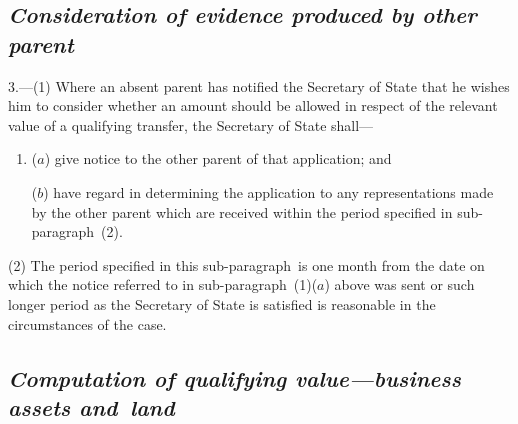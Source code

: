 \documentclass[12pt,a4paper]{article}
\begin{document}

\subsection*{\itshape Consideration of evidence produced by other parent}


3.—(1) Where an absent parent has notified the Secretary of State that he wishes him to consider whether an amount should be allowed in respect of the relevant value of a qualifying transfer, the Secretary of State shall—
\begin{enumerate}\item[]
($a$) give notice to the other parent of that application; and

($b$) have regard in determining the application to any representations made by the other parent which are received within the period specified in sub-paragraph~(2).
\end{enumerate}

(2) The period specified in this sub-paragraph~is one month from the date on which the notice referred to in sub-paragraph~(1)($a$) above was sent or such longer period as the Secretary of State is satisfied is reasonable in the circumstances of the case.


\subsection*{\itshape {Computation of qualifying value—business assets} and~land}
\end{document}
